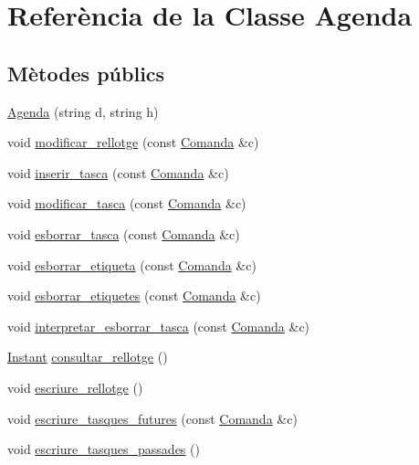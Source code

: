 \hypertarget{class_agenda}{}\section{Referència de la Classe Agenda}
\label{class_agenda}
\subsection*{Mètodes públics}
\begin{DoxyCompactItemize}
\item 
\hyperlink{class_agenda_a5c7b532b714bfbbe10e6be529160b45b}{Agenda} (string d, string h)
\item 
void \hyperlink{class_agenda_a9682676ce90d55251713aaf5d155f170}{modificar\+\_\+rellotge} (const \hyperlink{class_comanda}{Comanda} \&c)
\item 
void \hyperlink{class_agenda_a059521520bbff1406580f43870b7e6b0}{inserir\+\_\+tasca} (const \hyperlink{class_comanda}{Comanda} \&c)
\item 
void \hyperlink{class_agenda_a71ed63bb50f305d366ec34fe040de8e6}{modificar\+\_\+tasca} (const \hyperlink{class_comanda}{Comanda} \&c)
\item 
void \hyperlink{class_agenda_a8dff51b098687e4c0c1eb8f30de2fa67}{esborrar\+\_\+tasca} (const \hyperlink{class_comanda}{Comanda} \&c)
\item 
void \hyperlink{class_agenda_a657d2997d9e48b83c99690c1de906d22}{esborrar\+\_\+etiqueta} (const \hyperlink{class_comanda}{Comanda} \&c)
\item 
void \hyperlink{class_agenda_a5099d72df0fb0cbd0029190d7f49de22}{esborrar\+\_\+etiquetes} (const \hyperlink{class_comanda}{Comanda} \&c)
\item 
void \hyperlink{class_agenda_a07ef0637cc544831204b75d7e03f75f5}{interpretar\+\_\+esborrar\+\_\+tasca} (const \hyperlink{class_comanda}{Comanda} \&c)
\item 
\hyperlink{class_instant}{Instant} \hyperlink{class_agenda_afe4f34f7926211f357e04299ddfea46d}{consultar\+\_\+rellotge} ()
\item 
void \hyperlink{class_agenda_ac7896e2cca1324f1cb182666e934c49e}{escriure\+\_\+rellotge} ()
\item 
void \hyperlink{class_agenda_ae93a865556df581cd59c3f67f60a5609}{escriure\+\_\+tasques\+\_\+futures} (const \hyperlink{class_comanda}{Comanda} \&c)
\item 
void \hyperlink{class_agenda_a4dbb0df94e50d82c3924b387b26a6bf2}{escriure\+\_\+tasques\+\_\+passades} ()
\end{DoxyCompactItemize}
